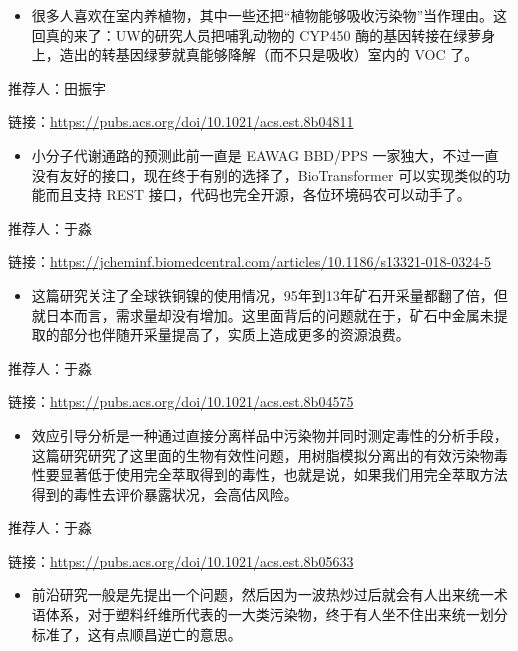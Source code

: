 \documentclass[]{book}
\providecommand{\tightlist}{%
  \setlength{\itemsep}{0pt}\setlength{\parskip}{0pt}}
\begin{document}
\begin{itemize}
\tightlist
\item
  很多人喜欢在室内养植物，其中一些还把``植物能够吸收污染物''当作理由。这回真的来了：UW的研究人员把哺乳动物的 CYP450 酶的基因转接在绿萝身上，造出的转基因绿萝就真能够降解（而不只是吸收）室内的 VOC 了。
\end{itemize}

推荐人：田振宇

链接：\url{https://pubs.acs.org/doi/10.1021/acs.est.8b04811}

\begin{itemize}
\tightlist
\item
  小分子代谢通路的预测此前一直是 EAWAG BBD/PPS 一家独大，不过一直没有友好的接口，现在终于有别的选择了，BioTransformer 可以实现类似的功能而且支持 REST 接口，代码也完全开源，各位环境码农可以动手了。
\end{itemize}

推荐人：于淼

链接：\url{https://jcheminf.biomedcentral.com/articles/10.1186/s13321-018-0324-5}

\begin{itemize}
\tightlist
\item
  这篇研究关注了全球铁铜镍的使用情况，95年到13年矿石开采量都翻了倍，但就日本而言，需求量却没有增加。这里面背后的问题就在于，矿石中金属未提取的部分也伴随开采量提高了，实质上造成更多的资源浪费。
\end{itemize}

推荐人：于淼

链接：\url{https://pubs.acs.org/doi/10.1021/acs.est.8b04575}

\begin{itemize}
\tightlist
\item
  效应引导分析是一种通过直接分离样品中污染物并同时测定毒性的分析手段，这篇研究研究了这里面的生物有效性问题，用树脂模拟分离出的有效污染物毒性要显著低于使用完全萃取得到的毒性，也就是说，如果我们用完全萃取方法得到的毒性去评价暴露状况，会高估风险。
\end{itemize}

推荐人：于淼

链接：\url{https://pubs.acs.org/doi/10.1021/acs.est.8b05633}

\begin{itemize}
\tightlist
\item
  前沿研究一般是先提出一个问题，然后因为一波热炒过后就会有人出来统一术语体系，对于塑料纤维所代表的一大类污染物，终于有人坐不住出来统一划分标准了，这有点顺昌逆亡的意思。
\end{itemize}
\end{document}
